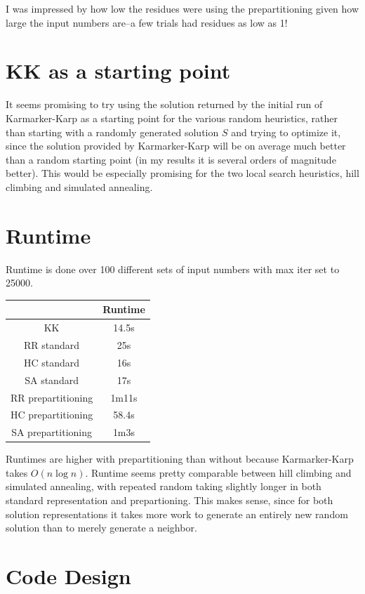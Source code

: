 \documentclass{article}
\begin{document}
I was impressed by how low the residues were using the prepartitioning given how large the input numbers are--a few trials had residues as low as 1!


\section*{KK as a starting point}
It seems promising to try using the solution returned by the initial run of Karmarker-Karp as a starting point for the various random heuristics, rather than starting with a randomly generated solution $S$ and trying to optimize it, since the solution provided by Karmarker-Karp will be on average much better than a random starting point (in my results it is several orders of magnitude better). This would be especially promising for the two local search heuristics, hill climbing and simulated annealing.  

\section*{Runtime}
Runtime is done over 100 different sets of input numbers with max iter set to 25000.
\begin{center}
\begin{tabular}{ | c | c |}
\hline
 & Runtime \\
\hline\hline
KK & 14.5s \\
\hline
RR standard & 25s \\
\hline
HC standard & 16s\\
\hline
SA standard & 17s\\
\hline
RR prepartitioning & 1m11s\\
\hline
HC prepartitioning & 58.4s\\
\hline
SA prepartitioning & 1m3s\\
\hline
\end{tabular}
\end{center}
Runtimes are higher with prepartitioning than without because Karmarker-Karp takes $O(n \log n)$. Runtime seems pretty comparable between hill climbing and simulated annealing, with repeated random taking slightly longer in both standard representation and prepartioning. This makes sense, since for both solution representations it takes more work to generate an entirely new random solution than to merely generate a neighbor. 

\section*{Code Design}
\end{document}
